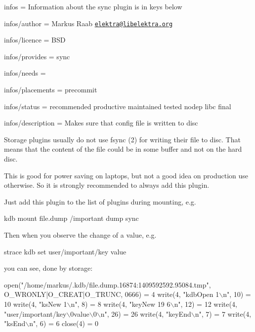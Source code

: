 
\begin{DoxyItemize}
\item infos = Information about the sync plugin is in keys below
\item infos/author = Markus Raab \href{mailto:elektra@libelektra.org}{\tt elektra@libelektra.\+org}
\item infos/licence = B\+SD
\item infos/provides = sync
\item infos/needs =
\item infos/placements = precommit
\item infos/status = recommended productive maintained tested nodep libc final
\item infos/description = Makes sure that config file is written to disc
\end{DoxyItemize}

Storage plugins usually do not use fsync (2) for writing their file to disc. That means that the content of the file could be in some buffer and not on the hard disc.

This is good for power saving on laptops, but not a good idea on production use otherwise. So it is strongly recommended to always add this plugin.

Just add this plugin to the list of plugins during mounting, e.\+g.


\begin{DoxyCode}
kdb mount file.dump /important dump sync
\end{DoxyCode}


Then when you observe the change of a value, e.\+g.


\begin{DoxyCode}
strace kdb set user/important/key value
\end{DoxyCode}


you can see, done by storage\+:


\begin{DoxyCode}
open("/home/markus/.kdb/file.dump.16874:1409592592.95084.tmp",
        O\_WRONLY|O\_CREAT|O\_TRUNC, 0666) = 4
write(4, "kdbOpen 1\(\backslash\)n", 10)             = 10
write(4, "ksNew 1\(\backslash\)n", 8)                = 8
write(4, "keyNew 19 6\(\backslash\)n", 12)           = 12
write(4, "user/important/key\(\backslash\)0value\(\backslash\)0\(\backslash\)n", 26) = 26
write(4, "keyEnd\(\backslash\)n", 7)                 = 7
write(4, "ksEnd\(\backslash\)n", 6)                  = 6
close(4)                                = 0
\end{DoxyCode}


